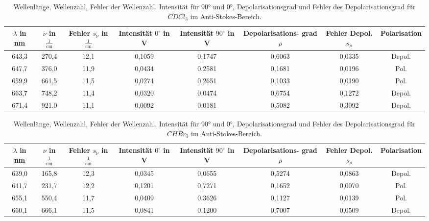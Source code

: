\begin{table}[h]
    \centering
    \begin{tabular}{c||c|c|c|c|c|c|c}
      \makecell{ $\lambda$ \\in nm} & $\nu$ in $\frac{1}{\text{cm}}$  & \makecell{ Fehler \\ $s_{\nu}$ in $\frac{1}{\text{cm}}$} & \makecell{Intensität\\ $0^{\circ}$ in V}  &  \makecell{Intensität\\ $90^{\circ}$ in V}  & \makecell{ Depolarisations- \\ grad $\rho$}  & \makecell{ Fehler \\ Depol. $s_{\rho}$} & Polarisation \\
    \hline
    643,3 & 270,4 & 12,1  & 0,1059 & 0,1747 & 0,6063 & 0,0335 & Depol. \\
    647,7 & 376,0 & 11,9  & 0,0434 & 0,2581 & 0,1681 & 0,0196 & Pol. \\
    659,9 & 661,5 & 11,5  & 0,0274 & 0,2651 & 0,1033 & 0,0190 & Pol. \\
    663,7 & 748,2 & 11,4  & 0,0320 & 0,0474 & 0,6754 & 0,1272 & Depol. \\
    671,4 & 921,0 & 11,1  & 0,0092 & 0,0181 & 0,5082 & 0,3092 & Depol. \\
  \end{tabular}%
\caption{Wellenlänge, Wellenzahl, Fehler der Wellenzahl, Intensität für 90° und 0°, Depolarisationsgrad und Fehler des Depolarisationsgrad für $CDCl_3$ im Anti-Stokes-Bereich.}
\end{table}\newpage
\begin{table}[h]
    \centering
    \begin{tabular}{c||c|c|c|c|c|c|c}
      \makecell{ $\lambda$ \\in nm} & $\nu$ in $\frac{1}{\text{cm}}$  & \makecell{ Fehler \\ $s_{\nu}$ in $\frac{1}{\text{cm}}$} & \makecell{Intensität\\ $0^{\circ}$ in V}  &  \makecell{Intensität\\ $90^{\circ}$ in V}  & \makecell{ Depolarisations- \\ grad $\rho$}  & \makecell{ Fehler \\ Depol. $s_{\rho}$} & Polarisation \\
      \hline
      639,0 & 165,8 & 12,3  & 0,0345 & 0,0655 & 0,5274 & 0,0863 & Depol. \\
      641,7 & 231,7 & 12,2  & 0,1201 & 0,7271 & 0,1652 & 0,0070 & Pol. \\
      655,1 & 550,4 & 11,7  & 0,0409 & 0,3626 & 0,1127 & 0,0139 & Pol. \\
      660,1 & 666,1 & 11,5  & 0,0841 & 0,1200 & 0,7007 & 0,0509 & Depol. \\  
    \end{tabular}%
    \caption{Wellenlänge, Wellenzahl, Fehler der Wellenzahl, Intensität für 90° und 0°, Depolarisationsgrad und Fehler des Depolarisationsgrad für $CHBr_3$ im Anti-Stokes-Bereich.}
\end{table}%
